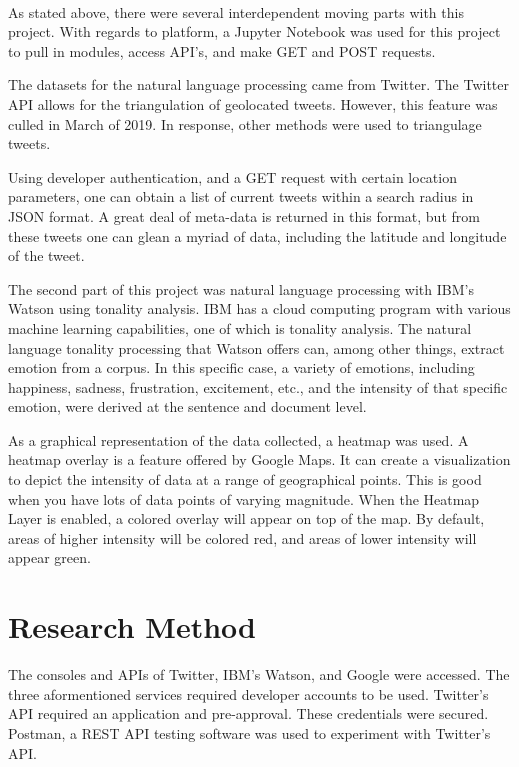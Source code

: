 \documentclass[12pt, oneside]{article}
\begin{document}
\paragraph{}
As stated above, there were several interdependent moving parts with this
project. With regards to platform, a Jupyter Notebook was used for this
project to pull in modules, access API's, and make GET and POST requests.

The datasets for the natural language processing came from Twitter. The
Twitter API allows for the triangulation of geolocated tweets\cite{TwitterGeo}.
However, this feature was culled in March of 2019. In response, other methods
were used to triangulage tweets.

Using developer authentication, and a GET request with certain location
parameters, one can obtain a list of current tweets within a search radius in
JSON format. A great deal of meta-data is returned in this format, but from
these tweets one can glean a myriad of data, including the latitude and
longitude of the tweet.

The second part of this project was natural language processing with IBM's
Watson using tonality analysis.
IBM has a cloud computing program with various machine learning
capabilities\cite{IBM}, one of which is tonality analysis. The natural language
tonality processing that Watson offers can, among other things, extract emotion
from a corpus. In this specific case, a variety of emotions, including
happiness, sadness, frustration, excitement, etc., and the intensity of that
specific emotion, were derived at the sentence and document level.

As a graphical representation of the data collected, a heatmap was used. A heatmap overlay is a feature offered by Google Maps. It can create a
visualization to depict the intensity of data at a range of geographical points.
This is good when you have lots of data points of varying magnitude.
When the Heatmap Layer is enabled, a colored overlay will appear on top of the
map. By default, areas of higher intensity will be colored red, and areas of
lower intensity will appear green\cite{Google}.

\section{Research Method}
 The consoles and APIs of Twitter, IBM's Watson, and Google were
 accessed. The three aformentioned services required developer accounts to be
 used. Twitter's API required an application and pre-approval. These
 credentials were secured. Postman, a REST API testing software was
 used to experiment with Twitter's API\cite{Postman}.
\end{document}
